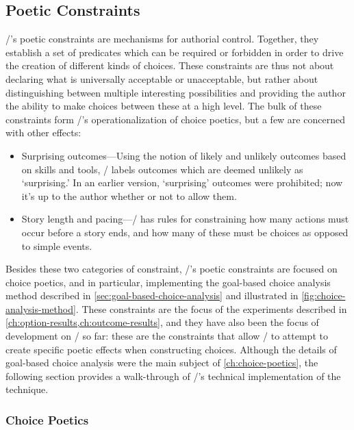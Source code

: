 \subsection{Poetic Constraints}
\label{sec:dunyazad-poetic-constraints}%

\dunyazad/'s poetic constraints are mechanisms for authorial control.
%
Together, they establish a set of predicates which can be required or forbidden in order to drive the creation of different kinds of choices.
%
These constraints are thus not about declaring what is universally acceptable or unacceptable, but rather about distinguishing between multiple interesting possibilities and providing the author the ability to make choices between these at a high level.
%
The bulk of these constraints form \dunyazad/'s operationalization of choice poetics, but a few are concerned with other effects:
%
\begin{itemize}
  \item Surprising outcomes---Using the notion of likely and unlikely outcomes based on skills and tools, \dunyazad/ labels outcomes which are deemed unlikely as `surprising.' In an earlier version, `surprising' outcomes were prohibited; now it's up to the author whether or not to allow them.
  \item Story length and pacing---\dunyazad/ has rules for constraining how many actions must occur before a story ends, and how many of these must be choices as opposed to simple events.
\end{itemize}
%
Besides these two categories of constraint, \dunyazad/'s poetic constraints are focused on choice poetics, and in particular, implementing the goal-based choice analysis method described in \cref{sec:goal-based-choice-analysis} and illustrated in \cref{fig:choice-analysis-method}.
%
These constraints are the focus of the experiments described in \cref{ch:option-results,ch:outcome-results}, and they have also been the focus of development on \dunyazad/ so far: these are the constraints that allow \dunyazad/ to attempt to create specific poetic effects when constructing choices.
%
Although the details of goal-based choice analysis were the main subject of \cref{ch:choice-poetics}, the following section provides a walk-through of \dunyazad/'s technical implementation of the technique.

\subsubsection{Choice Poetics}

